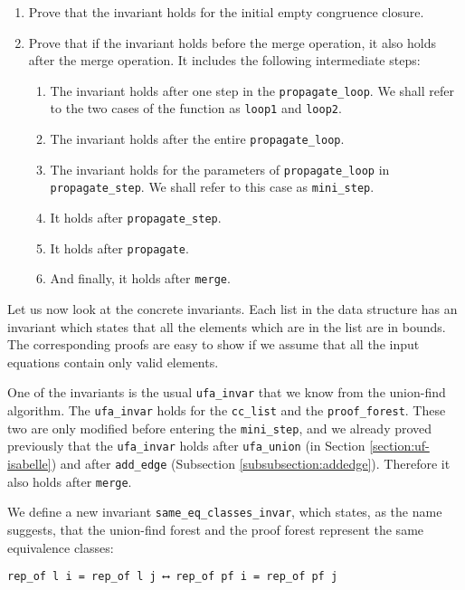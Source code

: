 \begin{enumerate}
	\item Prove that the invariant holds for the initial empty congruence closure.

	\item Prove that if the invariant holds before the merge operation, it also holds after the merge operation. It includes the following intermediate steps:
    \begin{enumerate}
        \item The invariant holds after one step in the \lstinline{propagate_loop}. We shall refer to the two cases of the function as \lstinline{loop1} and \lstinline{loop2}.
    	\item The invariant holds after the entire \lstinline{propagate_loop}.
    	\item The invariant holds for the parameters of \lstinline{propagate_loop} in \lstinline{propagate_step}. We shall refer to this case as \lstinline{mini_step}.
    	\item It holds after \lstinline{propagate_step}.
    	\item It holds after \lstinline{propagate}.
    	\item And finally, it holds after \lstinline{merge}.
    \end{enumerate}
\end{enumerate}

Let us now look at the concrete invariants. Each list in the data structure has an invariant which states that all the elements which are in the list are in bounds. The corresponding proofs are easy to show if we assume that all the input equations contain only valid elements.

One of the invariants is the usual \lstinline{ufa_invar} that we know from the union-find algorithm. The \lstinline{ufa_invar} holds for the \lstinline{cc_list} and the \lstinline{proof_forest}. These two are only modified before entering the \lstinline{mini_step}, and we already proved previously that the \lstinline{ufa_invar} holds after \lstinline{ufa_union} (in Section \ref{section:uf-isabelle}) and after \lstinline{add_edge} (Subsection \ref{subsubsection:addedge}). Therefore it also holds after \lstinline{merge}.

We define a new invariant \lstinline{same_eq_classes_invar}, which states, as the name suggests, that the union-find forest and the proof forest represent the same equivalence classes:

\begin{lstlisting}
rep_of l i = rep_of l j ⟷ rep_of pf i = rep_of pf j
\end{lstlisting}

